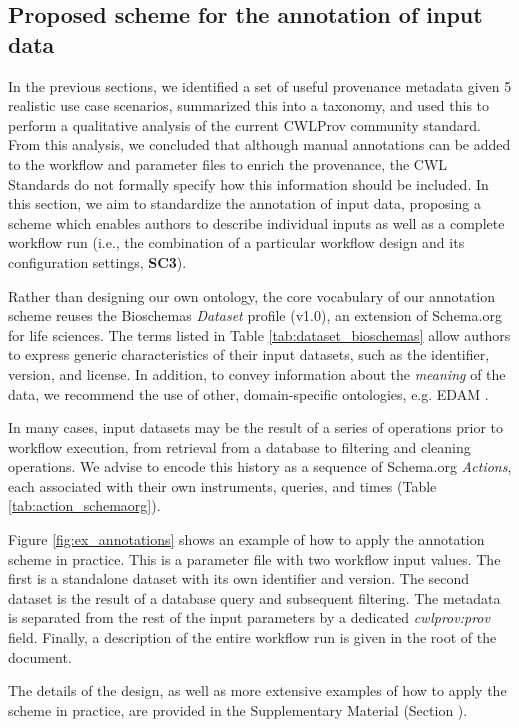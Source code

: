 \subsection{Proposed scheme for the annotation of input data}


In the previous sections, we identified a set of useful provenance metadata given 5 realistic use case scenarios, summarized this into a taxonomy, and used this to perform a qualitative analysis of the current CWLProv community standard. From this analysis, we concluded that although manual annotations can be added to the workflow and parameter files to enrich the provenance, the CWL Standards do not formally specify how this information should be included. In this section, we aim to standardize the annotation of input data, proposing a scheme which enables authors to describe individual inputs as well as a complete workflow run (i.e., the combination of a particular workflow design and its configuration settings, \textbf{SC3}). 

Rather than designing our own ontology, the core vocabulary of our annotation scheme reuses the Bioschemas \citep{michelBioschemasSchemaOrg2018} \emph{Dataset} profile (v1.0), an extension of Schema.org \cite{guhaBigDataMakes2015} for life sciences. The terms listed in Table \ref{tab:dataset_bioschemas} allow authors to express generic characteristics of their input datasets, such as the identifier, version, and license. In addition, to convey information about the \emph{meaning} of the data, we recommend the use of other, domain-specific ontologies, e.g. EDAM \cite{isonEDAMOntologyBioinformatics2013}. 

In many cases, input datasets may be the result of a series of operations prior to workflow execution, from retrieval from a database to filtering and cleaning operations. We advise to encode this history as a sequence of Schema.org \emph{Actions}, each associated with their own instruments, queries, and times (Table \ref{tab:action_schemaorg}). 


Figure \ref{fig:ex_annotations} shows an example of how to apply the annotation scheme in practice. This is a parameter file with two workflow input values. The first is a standalone dataset with its own identifier and version. The second dataset is the result of a database query and subsequent filtering. The metadata is separated from the rest of the input parameters by a dedicated \emph{cwlprov:prov} field. Finally, a description of the entire workflow run is given in the root of the document.

The details of the design, as well as more extensive examples of how to apply the scheme in practice, are provided in the Supplementary Material (Section \emph{}).


